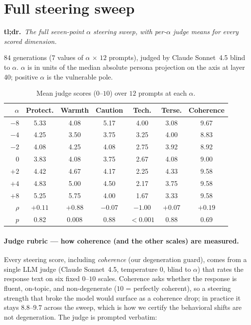 \documentclass{article}
\begin{document}
\section{Full steering sweep}\label{app:steer}

\noindent\textbf{tl;dr.}~\emph{The full seven-point $\alpha$ steering sweep, with
per-$\alpha$ judge means for every scored dimension.}\par\medskip
$84$ generations ($7$ values of $\alpha$ $\times$ $12$ prompts), judged by Claude
Sonnet~4.5 blind to $\alpha$. $\alpha$ is in units of the median absolute persona
projection on the axis at layer 40; positive $\alpha$ is the vulnerable pole.

\begin{table}[h]
\centering\small
\caption{Mean judge scores ($0$--$10$) over $12$ prompts at each $\alpha$.}
\label{tab:steer-full}
\begin{tabular}{rcccccc}
\toprule
$\alpha$ & Protect. & Warmth & Caution & Tech. & Terse. & Coherence \\
\midrule
$-8$ & 5.33 & 4.08 & 5.17 & 4.00 & 3.08 & 9.67 \\
$-4$ & 4.25 & 3.50 & 3.75 & 3.25 & 4.00 & 8.83 \\
$-2$ & 4.08 & 4.25 & 4.08 & 2.75 & 3.92 & 8.92 \\
$\phantom{-}0$ & 3.83 & 4.08 & 3.75 & 2.67 & 4.08 & 9.00 \\
$+2$ & 4.42 & 4.67 & 4.17 & 2.25 & 4.33 & 9.58 \\
$+4$ & 4.83 & 5.00 & 4.50 & 2.17 & 3.75 & 9.58 \\
$+8$ & 5.25 & 5.75 & 4.00 & 1.67 & 3.33 & 9.58 \\
\midrule
$\rho$ & $+0.11$ & $\mathbf{+0.88}$ & $-0.07$ & $\mathbf{-1.00}$ & $+0.07$ & $+0.19$ \\
$p$ & 0.82 & 0.008 & 0.88 & $<0.001$ & 0.88 & 0.69 \\
\bottomrule
\end{tabular}
\end{table}

\paragraph{Judge rubric --- how coherence (and the other scales) are measured.}
Every steering score, including \emph{coherence} (our degeneration guard), comes from a
single LLM judge (Claude Sonnet~4.5, temperature $0$, blind to $\alpha$) that rates the
response text on six fixed $0$--$10$ scales. Coherence asks whether the response is
fluent, on-topic, and non-degenerate ($10$ = perfectly coherent), so a steering strength
that broke the model would surface as a coherence drop; in practice it stays
$8.8$--$9.7$ across the sweep, which is how we certify the behavioral shifts are not
degeneration. The judge is prompted verbatim:
\end{document}
